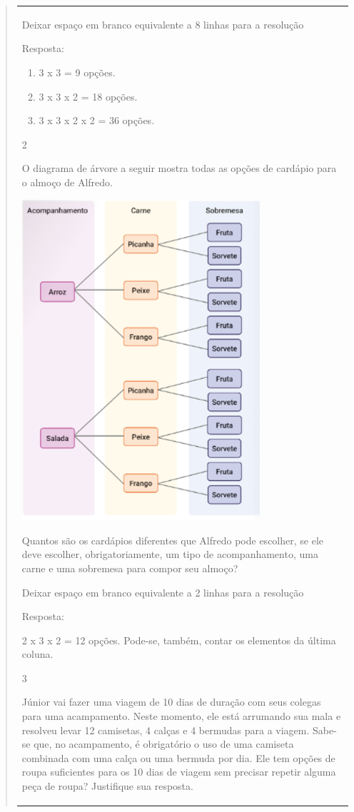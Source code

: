 \begin{mdframed}[linewidth=2pt,linecolor=salmao,roundcorner=2pt]
\begin{itemize}
{\begin{itemize}
\begin{escolha}
{\begin{quote}
{\begin{escolha}
{{{{{\begin{longtable}[]{@{}l@{}}
\begin{itemize}
{Deixar espaço em branco equivalente a 8 linhas para a resolução

Resposta:

\begin{enumerate}
\item
  3 x 3 = 9 opções.
\item
  3 x 3 x 2 = 18 opções.
\item
  3 x 3 x 2 x 2 = 36 opções.
\end{enumerate}

\num{2}

O diagrama de árvore a seguir mostra todas as opções de cardápio para o
almoço de Alfredo.


\includegraphics[width=3.46697in,height=4.68374in]{media/image138.png}

Quantos são os cardápios diferentes que Alfredo pode escolher, se
ele deve escolher, obrigatoriamente, um tipo de acompanhamento, uma
carne e uma sobremesa para compor seu almoço?

Deixar espaço em branco equivalente a 2 linhas para a resolução

Resposta:

2 x 3 x 2 = 12 opções. Pode-se, também, contar os elementos da última coluna.

\num{3}

Júnior vai fazer uma viagem de 10 dias de duração com seus colegas para
uma acampamento. Neste momento, ele está arrumando sua mala e resolveu
levar 12 camisetas, 4 calças e 4 bermudas para a viagem. Sabe-se que, no
acampamento, é obrigatório o uso de uma camiseta combinada com uma calça
ou uma bermuda por dia. Ele tem opções de roupa suficientes para os 10 dias de viagem sem
precisar repetir alguma peça de roupa? Justifique sua resposta.

}
\end{itemize}
\end{longtable}}}}}}
\end{escolha}}
\end{quote}}
\end{escolha}
\end{itemize}}
\end{itemize}
\end{mdframed}
